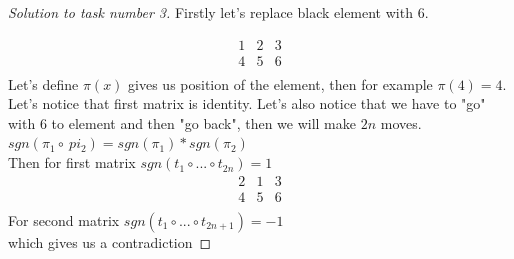 \documentclass[12pt,a4paper]{article}
\begin{document}
\begin{proof}[Solution to task number 3] Firstly let's replace black element with $6$.

\[
 \begin{matrix}
  1 & 2 & 3 \\
  4 & 5 & 6 \\
 \end{matrix}
\]
Let's define $\pi(x)$ gives us position of the element, then for example $\pi(4)=4$. Let's notice that first matrix is identity. Let's also notice that we have to "go" with $6$ to element and then "go back", then we will make $2n$ moves. \\
$sgn(\pi_1 \circ\ pi_2)=sgn(\pi_1)*sgn(\pi_2)$\\
Then for first matrix $sgn(t_1\circ...\circ t_{2n})=1$\\


\[
 \begin{matrix}
  2 & 1 & 3 \\
  4 & 5 & 6 \\
 \end{matrix}
\]
For second matrix $sgn(t_1\circ...\circ t_{2n+1})=-1$\\
which gives us a contradiction
\end{proof}
\vspace{1cm}
\end{document}
